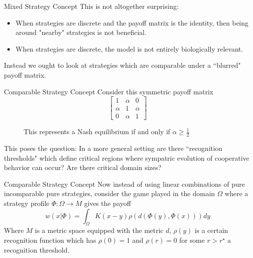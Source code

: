 \documentclass{beamer}
\begin{document}
\begin{frame}{Mixed Strategy Concept}
	This is not altogether surprising:
	\begin{itemize}
		\item When strategies are discrete and the payoff matrix is the identity, then being around "nearby" strategies is not beneficial. 
		\item When strategies are discrete, the model is not entirely biologically relevant. 
	\end{itemize}
	Instead we ought to look at strategies which are comparable under a ``blurred" payoff matrix. 
\end{frame}

\begin{frame}{Comparable Strategy Concept}
	Consider this symmetric payoff matrix
	\begin{equation}
		\begin{bmatrix}
			1&\alpha&0\\
			\alpha&1&\alpha\\
			0&\alpha&1
		\end{bmatrix}
	\end{equation}
	\begin{figure} 
	\caption{This represents a Nash equilibrium if and only if $\alpha\geq \frac{1}{2}$}
\end{figure}	
	This poses the question: In a more general setting are there ``recognition thresholds" which define critical regions where sympatric evolution of cooperative behavior can occur? Are there critical domain sizes?   
\end{frame}
	
\begin{frame}{Comparable Strategy Concept}
	Now instead of using linear combinations of pure incomparable pure strategies, consider the game played in the domain $\Omega$ where a strategy profile $\Phi:\Omega \rightarrow M$ gives the payoff
	\begin{equation}
		w(x|\Phi)= \int_\Omega K(x-y)\rho(d(\Phi(y),\Phi(x)))dy
	\end{equation}
	Where $M$ is a metric space equipped with the metric $d$, $\rho(y)$ is a certain recognition function which has $\rho (0)=1$ and $\rho(r)=0$ for some $r>r^\star$ a recognition threshold. 
\end{frame}
\end{document}
